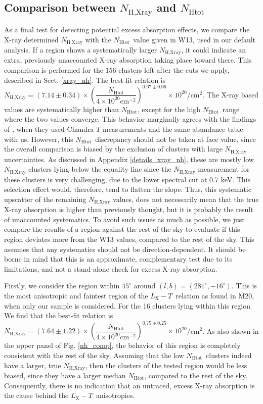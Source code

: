 \documentclass{aa}   %
\newcommand{\LT}{$L_{\text{X}}-T$}
\newcommand{\nhtot}{$N_{\text{Htot}}$}
\begin{document}
\subsection{Comparison between $N_{\text{H,Xray}}$ and \nhtot}

As a final test for detecting potential excess absorption effects, we compare the X-ray determined $N_{\text{H,Xray}}$ with the \nhtot\ value given in W13, used in our default analysis. If a region shows a systematically larger $N_{\text{H,Xray}}$, it could indicate an extra, previously unaccounted X-ray absorption taking place toward there. This comparison is performed for the 156 clusters left after the cuts we apply, described in Sect. \ref{xray_nh}. The best-fit relation is $N_{\text{H,Xray}}=(7.14\pm 0.34)\times \left(\dfrac{N_{\text{Htot}}}{4\times 10^{20}\text{cm}^{-2}}\right)^{0.67\pm 0.06}\times 10^{20}/$cm$^2$. The X-ray based values are systematically higher than \nhtot, except for the high \nhtot\ range where the two values converge. This behavior marginally agrees with the findings of \citet{schellenberger}, when they used Chandra $T$ measurements and the same abundance table with us. However, this \nhtot\ discrepancy should not be taken at face value, since the overall comparison is biased by the exclusion of clusters with large $N_{\text{H,Xray}}$ uncertainties. As discussed in Appendix \ref{details_xray_nh}, these are mostly low $N_{\text{H,Xray}}$ clusters lying below the equality line since the $N_{\text{H,Xray}}$ measurement for these clusters is very challenging, due to the lower spectral cut at 0.7 keV. This selection effect would, therefore, tend to flatten the slope. Thus, this systematic upscatter of the remaining $N_{\text{H,Xray}}$ values, does not necessarily mean that the true X-ray absorption is higher than previously thought, but it is probably the result of unaccounted systematics. To avoid such issues as much as possible, we just compare the results of a region against the rest of the sky to evaluate if this region deviates more from the W13 values, compared to the rest of the sky. This assumes that any systematics should not be direction-dependent. It should be borne in mind that this is an approximate, complementary test due to its limitations, and not a stand-alone check for excess X-ray absorption.

Firstly, we consider the region within $45^{\circ}$ around $(l,b)=(281^{\circ} ,-16^{\circ})$. This is the most anisotropic and faintest region of the \LT\ relation as found in M20, when only our sample is considered. For the 16 clusters lying within this region We find that the best-fit relation is $N_{\text{H,Xray}}=(7.64\pm 1.22)\times \left(\dfrac{N_{\text{Htot}}}{4\times 10^{20}\text{cm}^{-2}}\right)^{0.75\pm 0.25}\times 10^{20}/$cm$^2$. As also shown in the upper panel of Fig. \ref{nh_comp}, the behavior of this region is completely consistent with the rest of the sky. Assuming that the low \nhtot\ clusters indeed have a larger, true $N_{\text{H,Xray}}$, then the clusters of the tested region would be less biased, since they have a larger median \nhtot, compared to the rest of the sky. Consequently, there is no indication that an untraced, excess X-ray absorption is the cause behind the \LT\ anisotropies.
\end{document}

